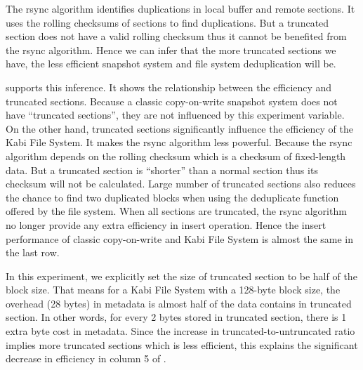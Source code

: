     The rsync algorithm identifies duplications in local buffer and remote sections. It uses the rolling checksums of sections to find duplications. But a truncated section does not have a valid rolling checksum thus it cannot be benefited from the rsync algorithm. Hence we can infer that the more truncated sections we have, the less efficient snapshot system and file system deduplication will be.

     supports this inference. It shows the relationship between the efficiency and truncated sections. Because a classic copy-on-write snapshot system does not have ``truncated sections'', they are not influenced by this experiment variable. On the other hand, truncated sections significantly influence the efficiency of the Kabi File System. It makes the rsync algorithm less powerful. Because the rsync algorithm depends on the rolling checksum which is a checksum of fixed-length data. But a truncated section is ``shorter'' than a normal section thus its checksum will not be calculated. Large number of truncated sections also reduces the chance to find two duplicated blocks when using the deduplicate function offered by the file system. When all sections are truncated, the rsync algorithm no longer provide any extra efficiency in insert operation. Hence the insert performance of classic copy-on-write and Kabi File System is almost the same in the last row.

    In this experiment, we explicitly set the size of truncated section to be half of the block size. That means for a Kabi File System with a 128-byte block size, the overhead (28 bytes) in metadata is almost half of the data contains in truncated section. In other words, for every 2 bytes stored in truncated section, there is 1 extra byte cost in metadata. Since the increase in truncated-to-untruncated ratio implies more truncated sections which is less efficient, this explains the significant decrease in efficiency in column 5 of .

